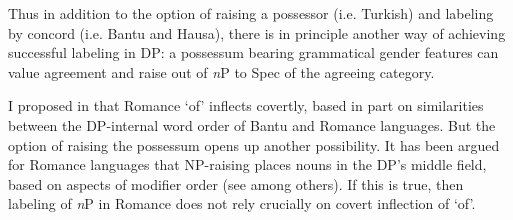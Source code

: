 \documentclass[output=paper
,modfonts
,nonflat]{langsci/langscibook}
\begin{document}
\begin{figure}
	\begin{exe}
	\end{exe}
\end{figure} 

Thus in addition to the option of raising a possessor (i.e. Turkish) and labeling by concord (i.e. Bantu and Hausa), there is in principle another way of achieving successful labeling in DP: a possessum bearing grammatical gender features can value agreement and raise out of \textit{n}P to Spec of the agreeing category.

I proposed in  that Romance ‘of’ inflects covertly, based in part on similarities between the DP-internal word order of Bantu and Romance languages. But the option of raising the possessum opens up another possibility. It has been argued for Romance languages that NP-raising places nouns in the DP’s middle field, based on aspects of modifier order (see \citealt{Laenzlinger2005} among others). If this is true, then labeling of \textit{n}P in Romance does not rely crucially on covert inflection of ‘of’. 
\end{document}
